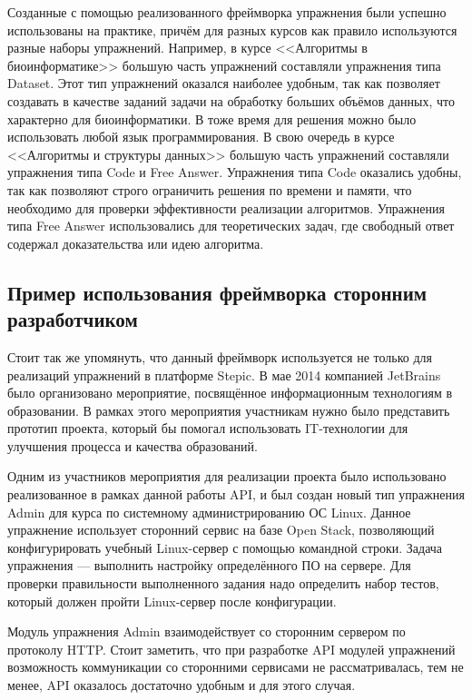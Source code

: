 \documentclass{matmex-diploma-custom}
\begin{document}
Созданные с помощью реализованного фреймворка упражнения были успешно
использованы на практике, причём для разных курсов как правило
используются разные наборы упражнений. Например, в курсе <<Алгоритмы в
биоинформатике>> большую часть упражнений составляли упражнения типа
Dataset. Этот тип упражнений оказался наиболее удобным, так как
позволяет создавать в качестве заданий задачи на обработку больших
объёмов данных, что характерно для биоинформатики. В тоже время для
решения можно было использовать любой язык программирования. В свою
очередь в курсе <<Алгоритмы и структуры данных>> большую часть
упражнений составляли упражнения типа Code и Free Answer. Упражнения
типа Code оказались удобны, так как позволяют строго ограничить
решения по времени и памяти, что необходимо для проверки эффективности
реализации алгоритмов. Упражнения типа Free Answer использовались для
теоретических задач, где свободный ответ содержал доказательства или
идею алгоритма.

\subsection{Пример использования фреймворка сторонним разработчиком}

Стоит так же упомянуть, что данный фреймворк используется не только
для реализаций упражнений в платформе Stepic. В мае 2014 компанией
JetBrains было организовано мероприятие, посвящённое информационным
технологиям в образовании. В рамках этого мероприятия участникам нужно
было представить прототип проекта, который бы помогал использовать
IT-технологии для улучшения процесса и качества образований.

Одним из участников мероприятия для реализации проекта было
использовано реализованное в рамках данной работы API, и был создан
новый тип упражнения Admin для курса по системному администрированию
ОС Linux. Данное упражнение использует сторонний сервис на базе Open
Stack, позволяющий конфигурировать учебный Linux-сервер с помощью
командной строки. Задача упражнения --- выполнить настройку
определённого ПО на сервере. Для проверки правильности выполненного
задания надо определить набор тестов, который должен пройти
Linux-сервер после конфигурации.

Модуль упражнения Admin взаимодействует со сторонним сервером по
протоколу HTTP. Стоит заметить, что при разработке API модулей
упражнений возможность коммуникации со сторонними сервисами не
рассматривалась, тем не менее, API оказалось достаточно удобным и для
этого случая.
\end{document}
